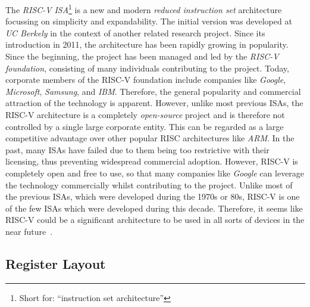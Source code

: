 The \emph{RISC-V} \emph{ISA}\footnote{Short for: \enquote{instruction set architecture}} is a new and modern \emph{reduced instruction set} architecture focussing on simplicity and expandability.
The initial version was developed at \emph{UC Berkely} in the context of another related research project.
Since its introduction in 2011, the architecture has been rapidly growing in popularity.
Since the beginning, the project has been managed and led by the \emph{RISC-V foundation}, consisting of many individuals contributing to the project.
Today, corporate members of the RISC-V foundation include companies like \emph{Google}, \emph{Microsoft}, \emph{Samsung}, and \emph{IBM}.
Therefore, the general popularity and commercial attraction of the technology is apparent.
However, unlike most previous ISAs, the RISC-V architecture is a completely \emph{open-source} project and is therefore not controlled by a single large corporate entity.
This can be regarded as a large competitive advantage over other popular RISC architectures like \emph{ARM}.
In the past, many ISAs have failed due to them being too restrictive with their licensing, thus preventing widespread commercial adoption.
However, RISC-V is completely open and free to use, so that many companies like \emph{Google} can leverage the technology commercially whilst contributing to the project.
Unlike most of the previous ISAs, which were developed during the 1970s or 80s, RISC-V is one of the few ISAs which were developed during this decade.
Therefore, it seems like RISC-V could be a significant architecture to be used in all sorts of devices in the near future~\cite[preface]{Patterson2017}.

\subsection{Register Layout}

